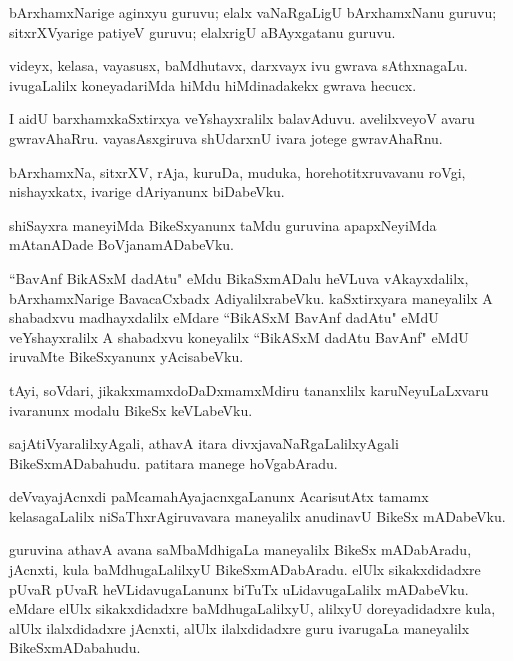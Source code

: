 \documentclass{article}
\begin{document}
\begin{mn}
bArxhamxNarige aginxyu guruvu; elalx vaNaRgaLigU bArxhamxNanu guruvu; sitxrXVyarige 
patiyeV guruvu; elalxrigU aBAyxgatanu guruvu.
\end{mn}

\begin{mn}
videyx, kelasa, vayasusx, baMdhutavx, darxvayx ivu gwrava sAthxnagaLu. ivugaLalilx 
koneyadariMda hiMdu hiMdinadakekx gwrava hecucx.
\end{mn}

\begin{mn}
I aidU barxhamxkaSxtirxya veYshayxralilx balavAduvu. avelilxveyoV avaru gwravAhaRru. 
vayasAsxgiruva shUdarxnU ivara jotege gwravAhaRnu.
\end{mn}

\begin{mn}
bArxhamxNa, sitxrXV, rAja, kuruDa, muduka, horehotitxruvavanu roVgi, nishayxkatx, ivarige 
dAriyanunx biDabeVku.
\end{mn}

\begin{mn}
shiSayxra maneyiMda BikeSxyanunx taMdu guruvina apapxNeyiMda mAtanADade BoVjanamADabeVku.
\end{mn}

\begin{mn}
``BavAnf BikASxM dadAtu" eMdu BikaSxmADalu heVLuva vAkayxdalilx, bArxhamxNarige BavacaCxbadx
AdiyalilxrabeVku. kaSxtirxyara maneyalilx A shabadxvu madhayxdalilx eMdare ``BikASxM
BavAnf dadAtu" eMdU veYshayxralilx A shabadxvu koneyalilx ``BikASxM dadAtu BavAnf" eMdU 
iruvaMte BikeSxyanunx yAcisabeVku.
\end{mn}

\begin{mn}
tAyi, soVdari, jikakxmamxdoDaDxmamxMdiru tananxlilx karuNeyuLaLxvaru ivaranunx modalu BikeSx
keVLabeVku.
\end{mn}

\begin{mn}
sajAtiVyaralilxyAgali, athavA itara divxjavaNaRgaLalilxyAgali BikeSxmADabahudu. patitara 
manege hoVgabAradu.
\end{mn}

\begin{mn}
deVvayajAcnxdi paMcamahAyajacnxgaLanunx AcarisutAtx tamamx kelasagaLalilx 
niSaThxrAgiruvavara maneyalilx anudinavU BikeSx mADabeVku.
\end{mn}

\begin{mn}
guruvina athavA avana saMbaMdhigaLa maneyalilx BikeSx mADabAradu, jAcnxti, kula 
baMdhugaLalilxyU BikeSxmADabAradu. elUlx sikakxdidadxre pUvaR pUvaR heVLidavugaLanunx 
biTuTx uLidavugaLalilx mADabeVku. eMdare elUlx sikakxdidadxre baMdhugaLalilxyU, alilxyU 
doreyadidadxre kula, alUlx ilalxdidadxre jAcnxti, alUlx ilalxdidadxre guru ivarugaLa 
maneyalilx BikeSxmADabahudu.
\end{mn}
\end{document}
